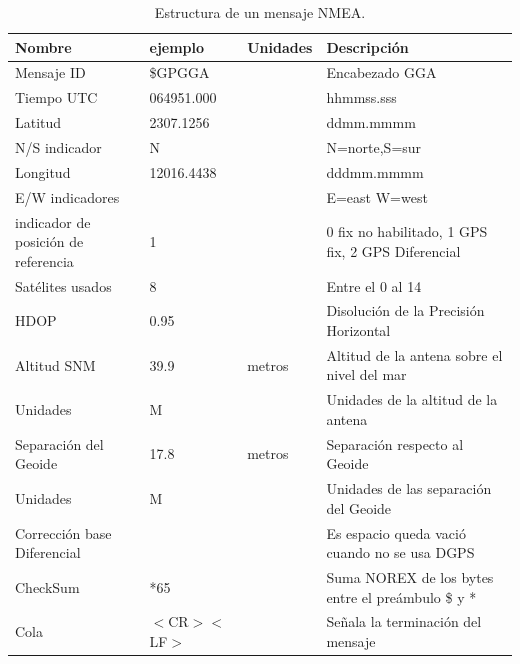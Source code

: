 \documentclass[10pt]{report}
\numberwithin{equation}{chapter}
\numberwithin{algorithm}{chapter}
\begin{document}
\begin{table}
\begin{center}
\begin{scriptsize}
\begin{tabular}{|p{1in}|p{1in}|p{0.6in}|p{1.6in}|} \hline
\textbf{Nombre}&\textbf{ejemplo}&\textbf{Unidades}&\textbf{Descripción}\\ \hline
Mensaje ID& \$GPGGA& &Encabezado GGA \\ \hline
Tiempo UTC& 064951.000& &hhmmss.sss \\ \hline
Latitud& 2307.1256& &ddmm.mmmm \\ \hline
N/S indicador &N& &N=norte,S=sur \\ \hline
Longitud& 12016.4438& &dddmm.mmmm \\ \hline
E/W indicadores& & &E=east W=west \\ \hline
indicador de posición de referencia& 1& &0 fix no habilitado, 1 GPS fix, 2 GPS Diferencial \\ \hline
Satélites usados& 8& &Entre el 0 al 14 \\ \hline
HDOP& 0.95& &Disolución de la Precisión Horizontal \\ \hline
Altitud SNM& 39.9&metros&Altitud de la antena sobre el nivel del mar \\ \hline
Unidades& M& &Unidades de la altitud de la antena \\ \hline
Separación del Geoide& 17.8&metros&Separación respecto al Geoide \\ \hline
Unidades& M& &Unidades de las separación del Geoide \\ \hline
Corrección base Diferencial& & &Es espacio queda vació cuando no se usa DGPS \\ \hline
CheckSum& *65& &Suma NOREX de los bytes entre el preámbulo \$ y * \\ \hline
Cola& $<$CR$>$$<$LF$>$& &Señala la terminación del mensaje \\ \hline
\end{tabular}
\end{scriptsize}
\end{center}
\caption{Estructura de un mensaje NMEA.
}
\label{fundamentosGPS_tb2}
\end{table} 
\newpage
{}
\end{document}
